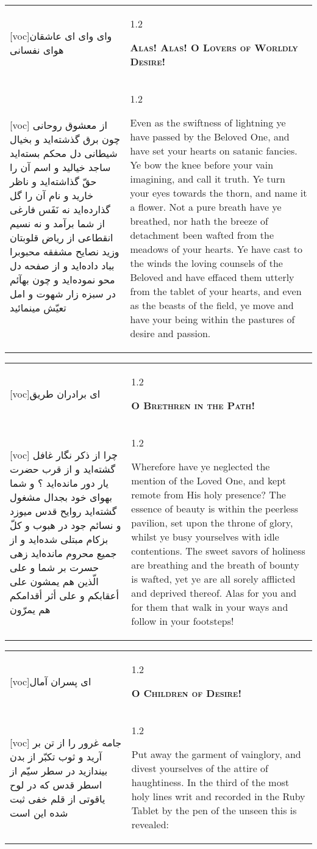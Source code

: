 \documentclass[11pt]{article}
\makeatletter
\newenvironment{orig}
  {\begin{farsi}[voc]}
  {\end{farsi}}
\newenvironment{trans}
  {\Large\begin{spacing}{1.2}\raggedright}
  {\end{spacing}}
\newenvironment{word}
  {\begin{tabular}[t]{p{2.75in}@{\hspace{3em}}p{2.75in}}}
  {\end{tabular}}
\newcommand{\ayat}[2]{\begin{orig}#1\end{orig} & \begin{trans}#2\end{trans}}
\newcommand{\heading}[2]{\textsc{\textbf{#1}} %
}
\makeatother
\begin{document}
\pagebreak

\begin{word}
\ayat{وای وای ای عاشقان هوای نفسانی}{\heading{Alas!  Alas!  O Lovers of Worldly Desire!}{}} \\ \ayat{
از معشوق روحانی چون برق گذشته‌ايد و بخيال شيطانی دل محکم بسته‌ايد
ساجد خياليد و اسم آن را حقّ گذاشته‌ايد و ناظر خاريد و نام آن را گل گذارده‌ايد نه نَفَس فارغی از شما برآمد و نه نسيم انقطاعی از رياض قلوبتان وزيد
نصايح مشفقه محبوبرا بباد داده‌ايد و از صفحه دل محو نموده‌ايد و چون بهآئم در سبزه زار شهوت و امل تعيّش مينمائيد
}{
  Even as the swiftness of lightning ye have passed by the Beloved One, and
  have set your hearts on satanic fancies. Ye bow the knee before your vain
  imagining, and call it truth. Ye turn your eyes towards the thorn, and name
  it a flower. Not a pure breath have ye breathed, nor hath the breeze of
  detachment been wafted from the meadows of your hearts. Ye have cast to the
  winds the loving counsels of the Beloved and have effaced them utterly from
  the tablet of your hearts, and even as the beasts of the field, ye move and
  have your being within the pastures of desire and passion.
}
\end{word}

\pagebreak

\begin{word}
\ayat{ای برادران طريق}{\heading{O Brethren in the Path!}{}} \\ \ayat{
چرا از ذکر نگار غافل گشته‌ايد و از قرب حضرت يار دور مانده‌ايد ؟ و شما بهوای خود بجدال مشغول گشته‌ايد
روايح قدس ميوزد و نسائم جود در هبوب و کلّ بزکام مبتلی شده‌ايد و از جميع محروم مانده‌ايد
زهی حسرت بر شما و علی الّذين هم يمشون علی أعقابکم و علی أثر أقدامکم هم يمرّون
}{
  Wherefore have ye neglected the mention of the Loved One, and kept remote
  from His holy presence? The essence of beauty is within the peerless
  pavilion, set upon the throne of glory, whilst ye busy yourselves with idle
  contentions. The sweet savors of holiness are breathing and the breath of
  bounty is wafted, yet ye are all sorely afflicted and deprived thereof. Alas
  for you and for them that walk in your ways and follow in your footsteps!
}
\end{word}

\pagebreak

\begin{word}
\ayat{ای پسران آمال}{\heading{O Children of Desire!}{}} \\ \ayat{
جامه غرور را از تن بر آريد و ثوب تکبّر از بدن بيندازيد در سطر سيّم از اسطر قدس که در لوح ياقوتی از قلم خفی ثبت شده اين است
}{
  Put away the garment of vainglory, and divest yourselves of the attire of
  haughtiness. In the third of the most holy lines writ and recorded in the
  Ruby Tablet by the pen of the unseen this is revealed:
}
\end{word}
\end{document}
